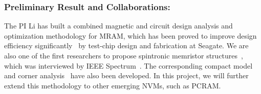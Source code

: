 \subsubsection{Preliminary Result and Collaborations:}
The PI Li has built a combined magnetic and circuit design analysis and optimization methodology for MRAM, which has been proved to improve design efficiency significantly~\cite{Chen08} by test-chip design and fabrication at Seagate. We are also one of the first researchers to propose spintronic memristor structures~\cite{Wang09}, which was interviewed by IEEE Spectrum~\cite{Spectrum09}. The corresponding compact model and corner analysis~\cite{Chen09} have also been developed. In this project, we will further extend this methodology to other emerging NVMs, such as PCRAM.

